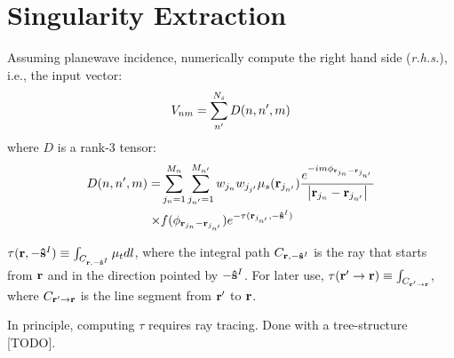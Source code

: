 \documentclass[main]{subfiles}
\begin{document}
\section{Singularity Extraction}
\label{sec:singularity extraction}
Assuming planewave incidence, numerically compute the right hand side 
(\textit{r.h.s.}), i.e., the input vector:
\begin{equation*} 
	V_{nm} = \sum\limits_{n^{\prime}}^{N_s} D(n,n^{\prime},m)
\end{equation*}
where $D$ is a rank-3 tensor:
\begin{equation*} \begin{split} 
	D(n,n^{\prime},m) =& \sum\limits_{j_n=1}^{M_n}
	\sum\limits_{j_{n^{\prime}}=1}^{M_{n^{\prime}}}
	w_{j_n}w_{j_{j^{\prime}}}\mu_s(\mathbf{r}_{j_{n^{\prime}}}) 
	\frac{e^{-i m\phi_{\mathbf{r}_{j_n}-\mathbf{r}_{j_{n^{\prime}}}}}}
	{\left| \mathbf{r}_{j_n}-\mathbf{r}_{j_{n^{\prime}}} \right|} \\ \times&
	f(\phi_{\mathbf{r}_{j_n}-\mathbf{r}_{j_{n^{\prime}}}})
	e^{-\tau(\mathbf{r}_{j_{n^{\prime}}},-\mathbf{\hat{s}}^I)}
\end{split} \end{equation*}

$\tau(\mathbf{r},-\mathbf{\hat{s}}^I)\equiv\int_{C_{\mathbf{r},-\mathbf{\hat{s}}^I}}\mu_t dl$, where the
integral path $C_{\mathbf{r},-\mathbf{\hat{s}}^I}$ is the ray that starts from $\mathbf{r}$ and in
the direction pointed by $-\mathbf{\hat{s}}^I$. For later use,
$\tau(\mathbf{r}^{\prime}\to\mathbf{r}) \equiv \int_{C_{\mathbf{r}^{\prime}\to\mathbf{r}}}$, where
$C_{\mathbf{r}^{\prime}\to\mathbf{r}}$ is the line segment from $\mathbf{r}^{\prime}$ to $\mathbf{r}$.

In principle, computing $\tau$ requires ray tracing. Done with a tree-structure
[TODO].
\end{document}
